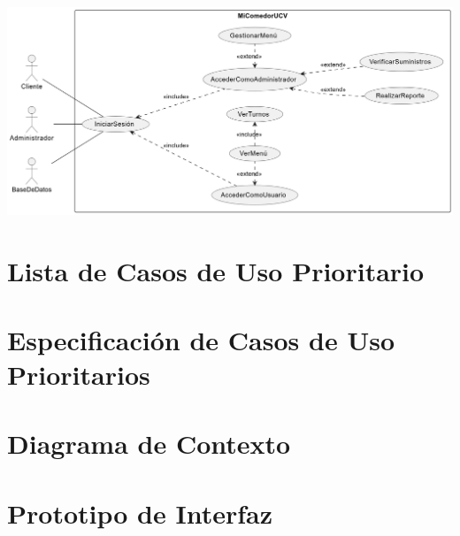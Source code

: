 \documentclass[12pt]{article}
\begin{document}
\vspace{1cm}

\begin{center}
	\includegraphics[width=15cm]{Requirements Discipline - Uses Cases Diagram.png}
\end{center}

\begin{center}
\end{center}

\pagebreak

\section{Lista de Casos de Uso Prioritario}

\vspace{1cm}

\begin{center}
\end{center}

\pagebreak

\section{Especificación de Casos de Uso Prioritarios}

\vspace{1cm}

\begin{center}
\end{center}

\pagebreak

\section{Diagrama de Contexto}

\vspace{1cm}

\begin{center}
\end{center}

\pagebreak

\section{Prototipo de Interfaz}

\vspace{1cm}

\begin{center}
\end{center}
\end{document}
